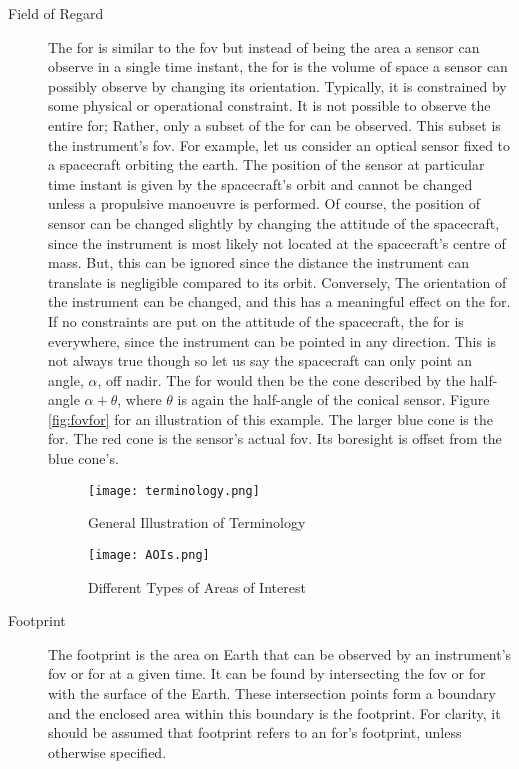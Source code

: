 \begin{description}
    \item[Field of Regard] The \gls{for} is similar to the \gls{fov} but
	instead of being the area a sensor can observe in a single time
	instant, the \gls{for} is the volume of space a sensor can possibly
	observe by changing its orientation. Typically, it is constrained by
	some physical or operational constraint. It is not possible to observe
	the entire \gls{for}; Rather, only a subset of the \gls{for} can be
	observed. This subset is the instrument's \gls{fov}.  For example, let
	us consider an optical sensor fixed to a spacecraft orbiting the earth.
	The position of the sensor at particular time instant is given by the
	spacecraft's orbit and cannot be changed unless a propulsive manoeuvre
	is performed.  Of course, the position of sensor can be changed
	slightly by changing the attitude of the spacecraft, since the
	instrument is most likely not located at the spacecraft's centre of
	mass. But, this can be ignored since the distance the instrument can
	translate is negligible compared to its orbit.  Conversely, The
	orientation of the instrument can be changed, and this has a meaningful
	effect on the \gls{for}. If no constraints are put on the attitude of
	the spacecraft, the \gls{for} is everywhere, since the instrument can
	be pointed in any direction. This is not always true though so let us
	say the spacecraft can only point an angle, $\alpha$, off nadir.  The
	\gls{for} would then be the cone described by the half-angle $\alpha +
	\theta$, where $\theta$ is again the half-angle of the conical sensor.
	Figure \ref{fig:fovfor} for an illustration of this example.  The
	larger blue cone is the \gls{for}. The red cone is the sensor's actual
	\gls{fov}. Its boresight is offset from the blue cone's.


\begin{figure} 
    \centering
    \begin{minipage}[c]{0.45\textwidth}
	\centering
	\texttt{[image: terminology.png]} 
	\caption{General Illustration of Terminology}
	\label{fig:terminology} 
    \end{minipage}
    \hfill
    \begin{minipage}[c]{0.45\textwidth}
	\centering
	\texttt{[image: AOIs.png]} 
	\caption{Different Types of Areas of Interest}
	\label{fig:AOIs} 
    \end{minipage} 
\end{figure}

    \item[Footprint] The footprint is the area on Earth that can be observed by
	an instrument's \gls{fov} or \gls{for} at a given time. It can be found
	by intersecting the \gls{fov} or \gls{for} with the surface of the
	Earth.  These intersection points form a boundary and the enclosed area
	within this boundary is the footprint. For clarity, it should be
	assumed that footprint refers to an \gls{for}'s footprint, unless
	otherwise specified.


\end{description}
